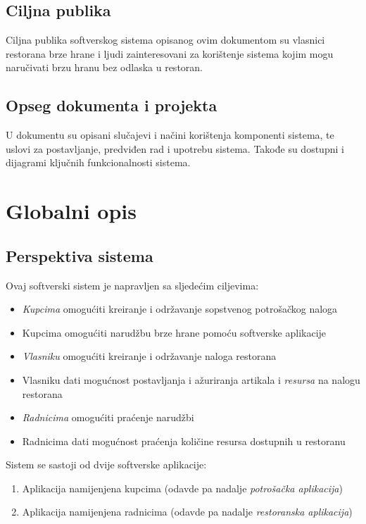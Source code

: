 \documentclass{scrreprt}
\begin{document}
\section{Ciljna publika}
Ciljna publika softverskog sistema opisanog ovim dokumentom su vlasnici restorana brze hrane
i ljudi zainteresovani za korištenje sistema kojim mogu naručivati brzu hranu bez odlaska u restoran.

\section{Opseg dokumenta i projekta}
U dokumentu su opisani slučajevi i načini korištenja komponenti sistema, te uslovi za
postavljanje, predviđen rad i upotrebu sistema.
Takođe su dostupni i dijagrami ključnih funkcionalnosti sistema.

\chapter{Globalni opis}

\section{Perspektiva sistema}
Ovaj softverski sistem je napravljen sa sljedećim ciljevima:

\begin{itemize}
	\itemsep0em
	\item \textit{Kupcima} omogućiti kreiranje i održavanje sopstvenog potrošačkog naloga
	\item Kupcima omogućiti narudžbu brze hrane pomoću softverske aplikacije
	\item \textit{Vlasniku} omogućiti kreiranje i održavanje naloga restorana
	\item Vlasniku dati mogućnost postavljanja i ažuriranja artikala i \textit{resursa} na nalogu restorana
	\item \textit{Radnicima} omogućiti praćenje narudžbi
	\item Radnicima dati mogućnost praćenja količine resursa dostupnih u restoranu
\end{itemize}

Sistem se sastoji od dvije softverske aplikacije:

\begin{enumerate}
	\itemsep0em
	\item Aplikacija namijenjena kupcima (odavde pa nadalje \textit{potrošačka aplikacija})
	\item Aplikacija namijenjena radnicima (odavde pa nadalje \textit{restoranska aplikacija})
\end{enumerate}
\end{document}

